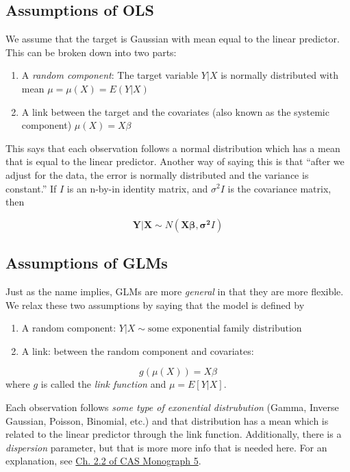 \documentclass[
  openany]{book}
\begin{document}
\hypertarget{assumptions-of-ols}{%
\subsection{Assumptions of OLS}\label{assumptions-of-ols}}

We assume that the target is Gaussian with mean equal to the linear predictor. This can be broken down into two parts:

\begin{enumerate}
\def\labelenumi{\arabic{enumi}.}
\item
  A \emph{random component}: The target variable \(Y|X\) is normally distributed with mean \(\mu = \mu(X) = E(Y|X)\)
\item
  A link between the target and the covariates (also known as the systemic component) \(\mu(X) = X\beta\)
\end{enumerate}

This says that each observation follows a normal distribution which has a mean that is equal to the linear predictor. Another way of saying this is that ``after we adjust for the data, the error is normally distributed and the variance is constant.'' If \(I\) is an n-by-in identity matrix, and \(\sigma^2 I\) is the covariance matrix, then

\[
\mathbf{Y|X} \sim N( \mathbf{X \beta}, \mathbf{\sigma^2} I)
\]

\hypertarget{assumptions-of-glms}{%
\subsection{Assumptions of GLMs}\label{assumptions-of-glms}}

Just as the name implies, GLMs are more \emph{general} in that they are more flexible. We relax these two assumptions by saying that the model is defined by

\begin{enumerate}
\def\labelenumi{\arabic{enumi}.}
\item
  A random component: \(Y|X \sim \text{some exponential family distribution}\)
\item
  A link: between the random component and covariates:
\end{enumerate}

\[g(\mu(X)) = X\beta\]
where \(g\) is called the \emph{link function} and \(\mu = E[Y|X]\).

Each observation follows \emph{some type of exonential distrubution} (Gamma, Inverse Gaussian, Poisson, Binomial, etc.) and that distribution has a mean which is related to the linear predictor through the link function. Additionally, there is a \emph{dispersion} parameter, but that is more more info that is needed here. For an explanation, see \href{https://www.casact.org/pubs/monographs/papers/05-Goldburd-Khare-Tevet.pdf}{Ch. 2.2 of CAS Monograph 5}.
\end{document}
